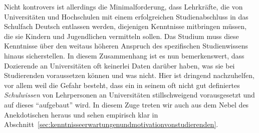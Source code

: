 Nicht kontrovers ist allerdings die Minimalforderung, dass Lehrkräfte, die von Universitäten und Hochschulen mit einem erfolgreichen Studienabschluss in das Schulfach Deutsch entlassen werden, diejenigen Kenntnisse mitbringen müssen, die sie Kindern und Jugendlichen vermitteln sollen.
Das Studium muss diese Kenntnisse über den weitaus höheren Anspruch des spezifischen Studienwissens hinaus sicherstellen.
In diesem Zusammenhang ist es nun bemerkenswert, dass Dozierende an Universitäten oft keinerlei Daten darüber haben, was sie bei Studierenden voraussetzen können und was nicht.
Hier ist dringend nachzuhelfen, vor allem weil die Gefahr besteht, dass ein in seinem oft nicht gut definiertes \textit{Schulwissen} von Lehrpersonen an Universitäten stillschweigend vorausgesetzt und auf dieses "`aufgebaut"' wird.
In diesem Zuge treten wir auch aus dem Nebel des Anekdotischen heraus und sehen empirisch klar in Abschnitt~\ref{sec:kenntnisseerwartungenundmotivationvonstudierenden}.


